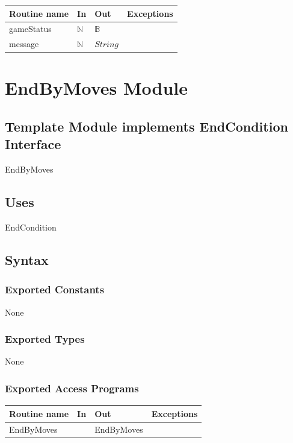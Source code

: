 \documentclass[12pt]{article}
\begin{document}
\begin{tabular}{| l | l | l | p{6cm} |}
\hline
\textbf{Routine name} & \textbf{In} & \textbf{Out} & \textbf{Exceptions}\\
\hline
gameStatus & $\mathbb{N}$ & $\mathbb{B}$ & \\
\hline
message & $\mathbb{N}$ & $String$ & \\
\hline
\end{tabular}

\newpage

\section* {EndByMoves Module}

\subsection* {Template Module implements EndCondition Interface}

EndByMoves

\subsection*{Uses}

EndCondition

\subsection* {Syntax}

\subsubsection*{Exported Constants}

None

\subsubsection*{Exported Types}

None

\subsubsection* {Exported Access Programs}

\begin{tabular}{| l | l | l | p{6cm} |}
\hline
\textbf{Routine name} & \textbf{In} & \textbf{Out} & \textbf{Exceptions}\\
\hline
EndByMoves & ~ & EndByMoves & \\
\hline
\end{tabular}
\end{document}
